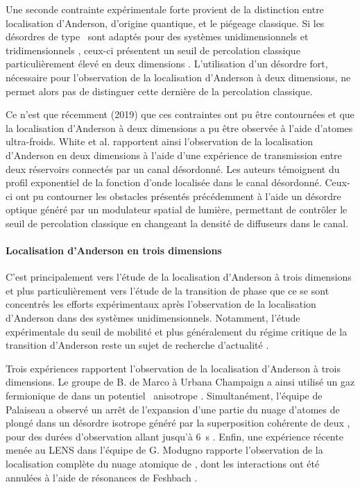 Une seconde contrainte expérimentale forte provient de la distinction entre localisation d'Anderson, d'origine quantique, et le piégeage classique. Si les désordres de type \speckle\ sont adaptés pour des systèmes unidimensionnels et tridimensionnels \citep{pilati2010dilute}, ceux-ci présentent un seuil de percolation classique particulièrement élevé en deux dimensions \citep{morong2015simulation}. L'utilisation d'un désordre fort, nécessaire pour l'observation de la localisation d'Anderson à deux dimensions, ne permet alors pas de distinguer cette dernière de la percolation classique.

Ce n'est que récemment (2019) que ces contraintes ont pu être contournées et que la localisation d'Anderson à deux dimensions a pu être observée à l'aide d'atomes ultra-froids. White et al. \citep{white2019observation} rapportent ainsi l'observation de la localisation d'Anderson en deux dimensions à l'aide d'une expérience de transmission entre deux réservoirs connectés par un canal désordonné. Les auteurs témoignent du profil exponentiel de la fonction d'onde localisée dans le canal désordonné. Ceux-ci ont pu contourner les obstacles présentés précédemment à l'aide un désordre optique généré par un modulateur spatial de lumière, permettant de contrôler le seuil de percolation classique en changeant la densité de diffuseurs dans le canal. 



\paragraph*{Localisation d'Anderson en trois dimensions}
C'est principalement vers l'étude de la localisation d'Anderson à trois dimensions et plus particulièrement vers l'étude de la transition de phase que ce se sont concentrés les efforts expérimentaux après l'observation de la localisation d'Anderson dans des systèmes unidimensionnels. Notamment, l'étude expérimentale du seuil de mobilité et plus généralement du régime critique de la transition d'Anderson reste un sujet de recherche d'actualité \citep{pasek2017anderson}.

Trois expériences rapportent l'observation de la localisation d'Anderson à trois dimensions. Le groupe de B. de Marco à Urbana Champaign a ainsi utilisé un gaz fermionique de  dans un potentiel \speckle\ anisotrope \citep{kondov2011three}. Simultanément, l'équipe de Palaiseau a observé un arrêt de l'expansion d'une partie du nuage d'atomes de  plongé dans un désordre isotrope généré par la superposition cohérente de deux \speckles , pour des durées d'observation allant jusqu'à \SI{6}{\second} \citep{jendrzejewski2012three}. Enfin, une expérience récente menée au LENS dans l'équipe de G. Modugno rapporte l'observation de la localisation complète du nuage atomique de , dont les interactions ont été annulées à l'aide de résonances de Feshbach \citep{semeghini2015measurement}.

